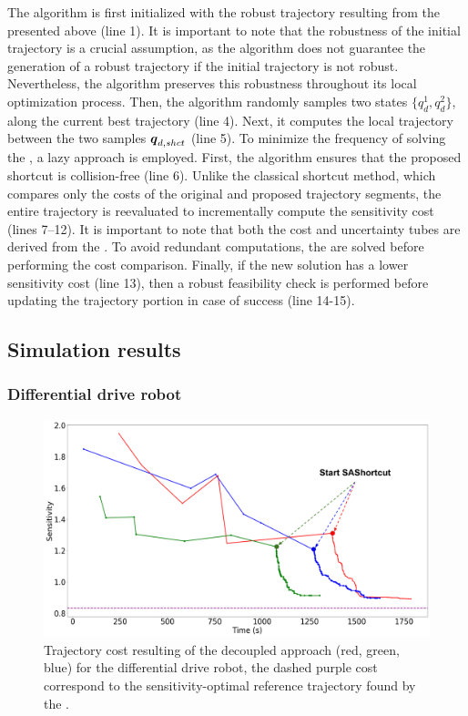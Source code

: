 The algorithm is first initialized with the robust trajectory resulting from the  presented above (line 1).
It is important to note that the robustness of the initial trajectory is a crucial assumption, as the  algorithm does not guarantee the generation of a robust trajectory if the initial trajectory is not robust.
Nevertheless, the algorithm preserves this robustness throughout its local optimization process.
Then, the algorithm randomly samples two states $\{q_d^{1}, q_d^{2}\}$, along the current best trajectory (line 4).
Next, it computes the local trajectory between the two samples $\boldsymbol{q}_{d,shct}$ (line 5).
To minimize the frequency of solving the , a lazy approach is employed.
First, the algorithm ensures that the proposed shortcut is collision-free (line 6). 
Unlike the classical shortcut method, which compares only the costs of the original and proposed trajectory segments, the entire trajectory is reevaluated to incrementally compute the sensitivity cost (lines 7–12).
It is important to note that both the cost and uncertainty tubes are derived from the . 
To avoid redundant computations, the  are solved before performing the cost comparison.
Finally, if the new solution has a lower sensitivity cost (line 13), then a robust feasibility check is performed before updating the trajectory portion in case of success (line 14-15).

\subsection{Simulation results}
\subsubsection{Differential drive robot}



\begin{figure}[htp]
    \centering
    \includegraphics[width=0.7\linewidth]{figures/samp/sensi_cost_unic.png}
    \caption{Trajectory cost resulting of the decoupled approach (red, green, blue) for the differential drive robot, the dashed purple cost correspond to the sensitivity-optimal reference trajectory found by the .}
    \label{fig:sensi_cost_unic}
\end{figure}

